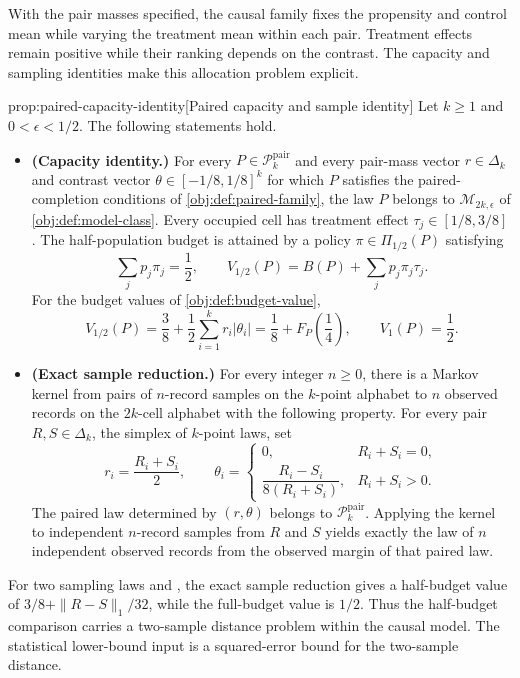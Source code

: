 \documentclass[11pt]{article}
\begin{document}
With the pair masses specified, the causal family fixes the propensity and control mean while varying the treatment mean within each pair. Treatment effects remain positive while their ranking depends on the contrast. The capacity and sampling identities make this allocation problem explicit.

\begin{propositionv}{prop:paired-capacity-identity}[Paired capacity and sample identity]
Let \(k\geq 1\) and \(0<\epsilon<1/2\). The following statements hold.
\begin{itemize}
\item \textbf{(Capacity identity.)} For every \(P\in\mathcal P^{\mathrm{pair}}_k\) and every pair-mass vector \(r\in\Delta_k\) and contrast vector \(\theta\in[-1/8,1/8]^k\) for which \(P\) satisfies the paired-completion conditions of \cref{obj:def:paired-family}, the law \(P\) belongs to \(\mathcal M_{2k,\epsilon}\) of \cref{obj:def:model-class}. Every occupied cell has treatment effect \(\tau_j\in[1/8,3/8]\). The half-population budget is attained by a policy \(\pi\in\Pi_{1/2}(P)\) satisfying
\[
\sum_j p_j\pi_j=\frac12,
\qquad
V_{1/2}(P)=B(P)+\sum_j p_j\pi_j\tau_j.
\]
For the budget values of \cref{obj:def:budget-value},
\[
V_{1/2}(P)
=\frac38+\frac12\sum_{i=1}^k r_i|\theta_i|
=\frac18+F_P\!\left(\frac14\right),
\qquad
V_1(P)=\frac12.
\]

\item \textbf{(Exact sample reduction.)} For every integer \(n\geq0\), there is a Markov kernel from pairs of \(n\)-record samples on the \(k\)-point alphabet to \(n\) observed records on the \(2k\)-cell alphabet with the following property. For every pair \(R,S\in\Delta_k\), the simplex of \(k\)-point laws, set
\[
r_i=\frac{R_i+S_i}{2},
\qquad
\theta_i=
\begin{cases}
0, & R_i+S_i=0,\\[2pt]
\dfrac{R_i-S_i}{8(R_i+S_i)}, & R_i+S_i>0.
\end{cases}
\]
The paired law determined by \((r,\theta)\) belongs to \(\mathcal P^{\mathrm{pair}}_k\). Applying the kernel to independent \(n\)-record samples from \(R\) and \(S\) yields exactly the law of \(n\) independent observed records from the observed margin of that paired law.
\end{itemize}
\end{propositionv}

For two sampling laws  and , the exact sample reduction gives a half-budget value of \(3/8+\|R-S\|_1/32\), while the full-budget value is \(1/2\). Thus the half-budget comparison carries a two-sample distance problem within the causal model. The statistical lower-bound input is a squared-error bound for the two-sample distance.
\end{document}
